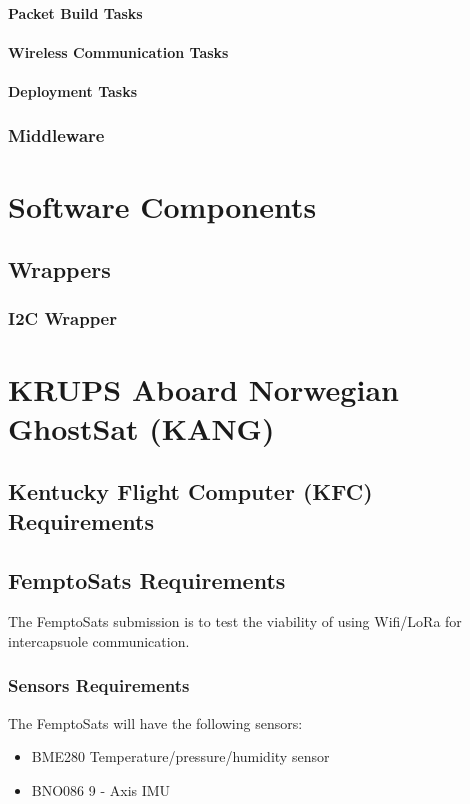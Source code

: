\documentclass{book}
\begin{document}
\subsubsection{Packet Build Tasks}
\subsubsection{Wireless Communication Tasks}
\subsubsection{Deployment Tasks}

\subsection{Middleware}
\chapter{Software Components}

\section{Wrappers}

\subsection{I2C Wrapper}

\chapter{KRUPS Aboard Norwegian GhostSat (KANG)}
\section{Kentucky Flight Computer (KFC) Requirements}

\section{FemptoSats Requirements}
\par The FemptoSats submission is to test the viability of using Wifi/LoRa for intercapsuole communication. 

\subsection{Sensors Requirements}
\par The FemptoSats will have the following sensors: 
\begin{itemize}
    \item BME280 Temperature/pressure/humidity sensor
    \item BNO086 9 - Axis IMU
\end{itemize}
\end{document}
